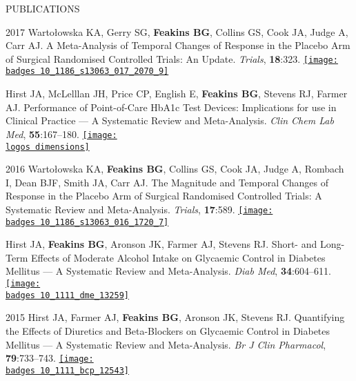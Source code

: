 \documentclass[10pt,a4paper]{article}
\def\badges{./badges/}
\def\logos{./logos/}
\begin{document}
\begin{cvlist}{PUBLICATIONS}
  \item[2017]
  Warto\l{}owska KA, Gerry SG, \textbf{Feakins BG}, Collins GS, Cook JA, Judge A, Carr AJ. A Meta-Analysis of Temporal Changes of Response in the Placebo Arm of Surgical Randomised Controlled Trials: An Update. \textit{Trials}, \textbf{18}:323.  \href{https://biomedcentral.altmetric.com/details/21804060}{\texttt{[image: \\badges 10\_1186\_s13063\_017\_2070\_9]}}
  
  \item[]
  Hirst JA, McLelllan JH, Price CP, English E, \textbf{Feakins BG}, Stevens RJ, Farmer AJ. Performance of Point-of-Care HbA1c Test Devices: Implications for use in Clinical Practice --- A Systematic Review and Meta-Analysis. \textit{Clin Chem Lab Med}, \textbf{55}:167--180.  \href{https://badge.dimensions.ai/details/id/pub.1036082624}{\texttt{[image: \\logos dimensions]}}
  
  \item[2016]
  Warto\l{}owska KA, \textbf{Feakins BG}, Collins GS, Cook JA, Judge A, Rombach I, Dean BJF, Smith JA, Carr AJ. The Magnitude and Temporal Changes of Response in the Placebo Arm of Surgical Randomised Controlled Trials: A Systematic Review and Meta-Analysis. \textit{Trials}, \textbf{17}:589.  \href{https://biomedcentral.altmetric.com/details/14679542}{\texttt{[image: \\badges 10\_1186\_s13063\_016\_1720\_7]}}
  
  \item[]
  Hirst JA, \textbf{Feakins BG}, Aronson JK, Farmer AJ, Stevens RJ. Short- and Long-Term Effects of Moderate Alcohol Intake on Glycaemic Control in Diabetes Mellitus --- A Systematic Review and Meta-Analysis. \textit{Diab Med}, \textbf{34}:604--611.  \href{https://wiley.altmetric.com/details/11898077}{\texttt{[image: \\badges 10\_1111\_dme\_13259]}}
  
  \item[2015]
  Hirst JA, Farmer AJ, \textbf{Feakins BG}, Aronson JK, Stevens RJ. Quantifying the Effects of Diuretics and Beta-Blockers on Glycaemic Control in Diabetes Mellitus --- A Systematic Review and Meta-Analysis. \textit{Br J Clin Pharmacol}, \textbf{79}:733--743.  \href{https://wiley.altmetric.com/details/2869563}{\texttt{[image: \\badges 10\_1111\_bcp\_12543]}}
  
\end{cvlist}
\end{document}
